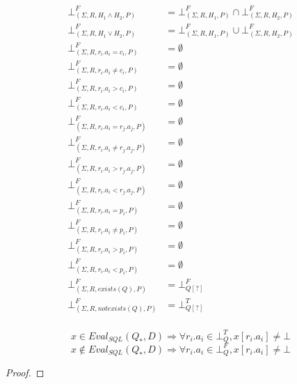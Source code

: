 \begin{mydef}
	\begin{align*}
		\bot^F_{(\Sigma,R,H_1 \land H_2,P)} & = \bot^F_{(\Sigma,R,H_1,P)} \cap \bot^F_{(\Sigma,R,H_2,P)} \\
		\bot^F_{(\Sigma,R,H_1 \lor H_2,P)} & = \bot^F_{(\Sigma,R,H_1,P)} \cup \bot^F_{(\Sigma,R,H_2,P)} \\
		\bot^F_{(\Sigma,R,r_i.a_i = c_i,P)} & =\emptyset \\
		\bot^F_{(\Sigma,R,r_i.a_i \neq c_i,P)} & = \emptyset \\
		\bot^F_{(\Sigma,R,r_i.a_i > c_i,P)} & =\emptyset \\
		\bot^F_{(\Sigma,R,r_i.a_i < c_i,P)} & =\emptyset \\
		\bot^F_{(\Sigma,R,r_i.a_i = r_j.a_j,P)} & = \emptyset \\
		\bot^F_{(\Sigma,R,r_i.a_i \neq r_j.a_j,P)} & = \emptyset \\
		\bot^F_{(\Sigma,R,r_i.a_i > r_j.a_j,P)} & = \emptyset \\
		\bot^F_{(\Sigma,R,r_i.a_i < r_j.a_j,P)} & = \emptyset \\
		\bot^F_{(\Sigma,R,r_i.a_i = p_i,P)} & = \emptyset\\
		\bot^F_{(\Sigma,R,r_i.a_i \neq p_i,P)} & = \emptyset \\
		\bot^F_{(\Sigma,R,r_i.a_i > p_i,P)} & = \emptyset\\
		\bot^F_{(\Sigma,R,r_i.a_i < p_i,P)} & = \emptyset\\
		\bot^F_{(\Sigma,R,exists(Q),P)} & = \bot^F_{Q[?]} \\
		\bot^F_{(\Sigma,R,notexists(Q),P)} & = \bot^T_{Q[?]}\\
	\end{align*}
\end{mydef}

\begin{myprop}
	$$x \in Eval_{SQL}(Q_*,D)  \Rightarrow \forall r_i.a_i \in \bot^T_Q, x[r_i.a_i] \neq \bot$$
	$$x \notin Eval_{SQL}(Q_*,D)  \Rightarrow \forall r_i.a_i \in \bot^F_Q, x[r_i.a_i] \neq \bot$$
\end{myprop}

\begin{proof}
			
\end{proof}


